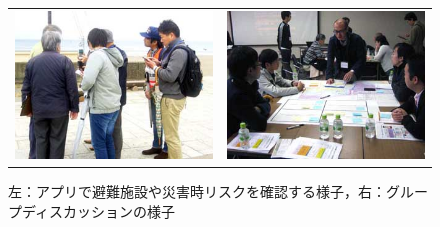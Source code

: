 \documentclass[a4paper]{jsarticle}
\begin{document}
\fifigure
\begin{figure}[H]
  \begin{center}
    \begin{tabular}{cc}
    \begin{minipage}{0.5\hsize}
	\includegraphics[width=\hsize]{./images/kamakura_01.jpg}
    \end{minipage}
    &
    \begin{minipage}{0.5\hsize}
      \includegraphics[width=\hsize]{./images/kamakura_02.jpg}
    \end{minipage}
  \end{tabular}
    \caption{左：アプリで避難施設や災害時リスクを確認する様子，右：グループディスカッションの様子}
    \label{fig:kamakura-01}
  \end{center}
\end{figure}
\fi
\end{document}
